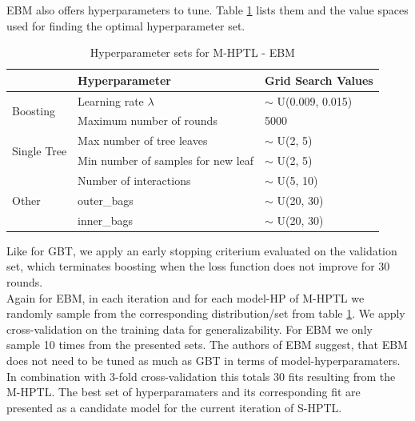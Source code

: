 \documentclass[12pt,titlepage]{article}
\begin{document}
EBM also offers hyperparameters to tune. Table \ref{hpebm} lists them and the value spaces used for finding the optimal hyperparameter set. \\
\begin{table}[H]
    \centering
    \begin{tabular}{|l|l|l|}
    \hline
    \multicolumn{1}{|l|}{}                                       & Hyperparameter                            & Grid Search Values       \\
    \hline
    \multirow{2}{*}{Boosting}                         & Learning rate $\lambda$                                                                & $\sim$ U(0.009, 0.015)  \\
    & Maximum number of rounds            &         5000        \\
    \hline
    \multicolumn{1}{|l|}{\multirow{2}{*}{Single Tree}} & Max number of tree leaves          &  $\sim$ U(2, 5)                        \\
    \multicolumn{1}{|l|}{}                                       & Min number of samples for new leaf   &      $\sim$ U(2, 5)       \\
    \hline
    \multicolumn{1}{|l|}{\multirow{3}{*}{Other}} & Number of interactions          &       $\sim$ U(5, 10)      \\
    \multicolumn{1}{|l|}{}                                       & outer\_bags   &        $\sim$ U(20, 30)   \\
    \multicolumn{1}{|l|}{}                                       & inner\_bags   &       $\sim$ U(20, 30)   \\
    \hline
    \end{tabular}
    \caption{Hyperparameter sets for M-HPTL - EBM}
\label{hpebm}
\end{table}
\vspace{3mm}
\noindent
Like for GBT, we apply an early stopping criterium evaluated on the validation set, which terminates boosting when the loss function does not improve for 30 rounds. \\
Again for EBM, in each iteration and for each model-HP of M-HPTL we randomly sample from the corresponding distribution/set from table \ref{hpebm}. We apply cross-validation on the training data for generalizability. For EBM we only sample 10 times from the presented sets. The authors of EBM suggest, that EBM does not need to be tuned as much as GBT in terms of model-hyperparamaters. In combination with 3-fold cross-validation this totals 30 fits resulting from the M-HPTL. The best set of hyperparamaters and its corresponding fit are presented as a candidate model for the current iteration of S-HPTL.\\
\end{document}
